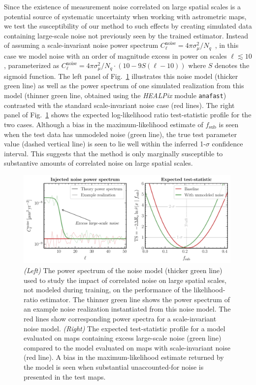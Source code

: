 \documentclass[twocolumn,linenumbers]{aastex631}
\newcommand{\package}[1]{\textsl{#1}\xspace}
\newcommand{\healpix}{\package{HEALPix}}
\begin{document}
Since the existence of measurement noise correlated on large spatial scales is a potential source of systematic uncertainty when working with astrometric maps, we test the susceptibility of our method to such effects by creating simulated data containing large-scale noise not previously seen by the trained estimator. Instead of assuming a scale-invariant noise power spectrum $C_\ell^\mathrm{noise} = 4\pi \sigma_{\mu}^2 / N_q$~\citep{Mishra-Sharma:2020ynk}, in this case we model noise with an order of magnitude excess in power on scales $\ell \lesssim 10$, parameterized as $C_\ell^\mathrm{noise} = 4\pi\sigma_{\mu}^2 / N_q \cdot \left(10 - 9 S(\ell - 10)\right)$ where $S$ denotes the sigmoid function.
The left panel of Fig.~\ref{fig:noise_test} illustrates this noise model (thicker green line) as well as the power spectrum of one simulated realization from this model (thinner green line, obtained using the \healpix module \texttt{anafast}) contrasted with the standard scale-invariant noise case (red lines). The right panel of Fig.~\ref{fig:noise_test} shows the expected log-likelihood ratio test-statistic profile for the two cases. Although a bias in the maximum-likelihood estimate of $f_\mathrm{sub}$ is seen when the test data has unmodeled noise (green line), the true test parameter value (dashed vertical line) is seen to lie well within the inferred 1-$\sigma$ confidence interval. This suggests that the method is only marginally susceptible to substantive amounts of correlated noise on large spatial scales.

\begin{figure}[!htbp]
\centering
\includegraphics[width=0.99\textwidth]{lowell_noise}
\caption{\emph{(Left)} The power spectrum of the noise model (thicker green line) used to study the impact of correlated noise on large spatial scales, not modeled during training, on the performance of the likelihood-ratio estimator. The thinner green line shows the power spectrum of an example noise realization instantiated from this noise model. The red lines show corresponding power spectra for a scale-invariant noise model.  \emph{(Right)} The expected  test-statistic profile for a model evaluated on maps containing excess large-scale noise (green line) compared to the model evaluated on maps with scale-invariant noise (red line). A bias in the maximum-likelihood estimate returned by the model is seen when substantial unaccounted-for noise is presented in the test maps.}
\label{fig:noise_test}
\end{figure}
\end{document}
